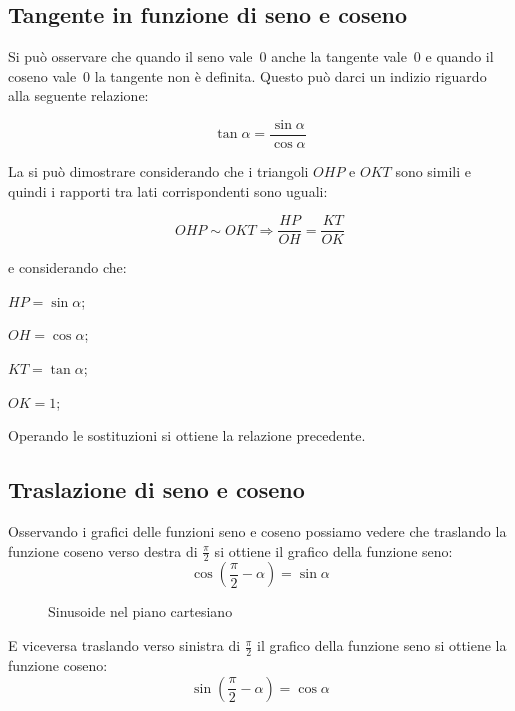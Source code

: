 \subsection{Tangente in funzione di seno e coseno}

Si può osservare che quando il seno vale~0 anche la tangente vale~0 e quando 
il coseno vale~0 la tangente non è definita. Questo può darci un indizio 
riguardo alla seguente relazione:

\[\tan \alpha = \frac{\sin \alpha}{\cos \alpha}\]

La si può dimostrare considerando che i triangoli $OHP$ e $OKT$ sono simili
e quindi i rapporti tra lati corrispondenti sono uguali:

\[OHP \sim OKT \Rightarrow \frac{HP}{OH} = \frac{KT}{OK}\]

\begin{minipage}{.3\textwidth}
e considerando che:
\begin{itemize*}
 \item $HP = \sin \alpha$;
 \item $OH = \cos \alpha$;
 \item $KT = \tan \alpha$;
 \item $OK = 1$;
\end{itemize*}
Operando le sostituzioni si ottiene la relazione precedente.
\end{minipage}
\begin{minipage}{.6\textwidth}
\begin{center}
 
\end{center}
\end{minipage}

\subsection{Traslazione di seno e coseno}

Osservando i grafici delle funzioni seno e coseno possiamo vedere che traslando
la funzione coseno verso destra di $\frac{\pi}{2}$ si ottiene il grafico della 
funzione seno:
\[\cos\left(\frac{\pi}{2}-\alpha\right)=\sin\alpha\]
\vspace{-6pt}
\begin{figure}[!h] 
  \begin{center}
\begin{inaccessibleblock}
    
    \caption{Sinusoide nel piano cartesiano}
    \label{fig:trigo_sin_cos}
\end{inaccessibleblock}
  \end{center}
\vspace{-12pt}
\end{figure} 
\vspace{-6pt}
E viceversa traslando verso sinistra di $\frac{\pi}{2}$ il grafico della 
funzione seno si ottiene la funzione coseno:
\[\sin\left(\frac{\pi}{2}-\alpha\right)=\cos\alpha\]

